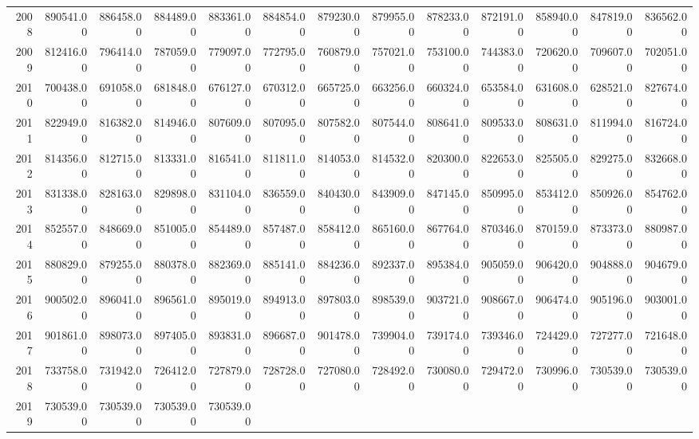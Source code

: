 \begin{longtable}{rrrrrrrrrrrrr}
  2008 & 890541.00 & 886458.00 & 884489.00 & 883361.00 & 884854.00 & 879230.00 & 879955.00 & 878233.00 & 872191.00 & 858940.00 & 847819.00 & 836562.00 \\ 
  2009 & 812416.00 & 796414.00 & 787059.00 & 779097.00 & 772795.00 & 760879.00 & 757021.00 & 753100.00 & 744383.00 & 720620.00 & 709607.00 & 702051.00 \\ 
  2010 & 700438.00 & 691058.00 & 681848.00 & 676127.00 & 670312.00 & 665725.00 & 663256.00 & 660324.00 & 653584.00 & 631608.00 & 628521.00 & 827674.00 \\ 
  2011 & 822949.00 & 816382.00 & 814946.00 & 807609.00 & 807095.00 & 807582.00 & 807544.00 & 808641.00 & 809533.00 & 808631.00 & 811994.00 & 816724.00 \\ 
  2012 & 814356.00 & 812715.00 & 813331.00 & 816541.00 & 811811.00 & 814053.00 & 814532.00 & 820300.00 & 822653.00 & 825505.00 & 829275.00 & 832668.00 \\ 
  2013 & 831338.00 & 828163.00 & 829898.00 & 831104.00 & 836559.00 & 840430.00 & 843909.00 & 847145.00 & 850995.00 & 853412.00 & 850926.00 & 854762.00 \\ 
  2014 & 852557.00 & 848669.00 & 851005.00 & 854489.00 & 857487.00 & 858412.00 & 865160.00 & 867764.00 & 870346.00 & 870159.00 & 873373.00 & 880987.00 \\ 
  2015 & 880829.00 & 879255.00 & 880378.00 & 882369.00 & 885141.00 & 884236.00 & 892337.00 & 895384.00 & 905059.00 & 906420.00 & 904888.00 & 904679.00 \\ 
  2016 & 900502.00 & 896041.00 & 896561.00 & 895019.00 & 894913.00 & 897803.00 & 898539.00 & 903721.00 & 908667.00 & 906474.00 & 905196.00 & 903001.00 \\ 
  2017 & 901861.00 & 898073.00 & 897405.00 & 893831.00 & 896687.00 & 901478.00 & 739904.00 & 739174.00 & 739346.00 & 724429.00 & 727277.00 & 721648.00 \\ 
  2018 & 733758.00 & 731942.00 & 726412.00 & 727879.00 & 728728.00 & 727080.00 & 728492.00 & 730080.00 & 729472.00 & 730996.00 & 730539.00 & 730539.00 \\ 
  2019 & 730539.00 & 730539.00 & 730539.00 & 730539.00 &  &  &  &  &  &  &  &  \\ 
   \hline
\hline
\end{longtable}
